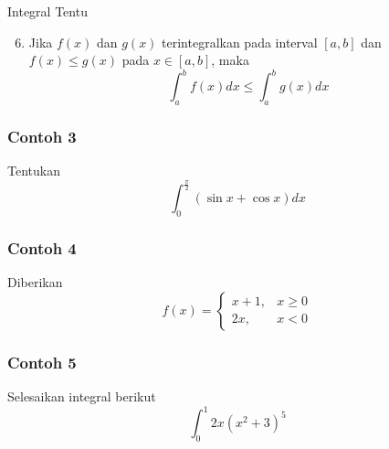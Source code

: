 \documentclass[pdflatex,compress,mathserif]{beamer}
\begin{document}
		\begin{frame}{Integral Tentu}
			\begin{enumerate}\setcounter{enumi}{5}
				\item Jika $ f(x) $ dan $ g(x) $ terintegralkan pada interval $ [a, b] $ dan $ f(x) \leq g(x) $ pada $ x \in [a, b] $,
				maka
				\begin{equation}
					\int_{a}^{b} f(x) dx \leq \int_{a}^{b} g(x) dx
				\end{equation}
			\end{enumerate}
		\end{frame}
		
		\begin{frame}
			\frametitle{Contoh 3}
			Tentukan $$ \int_{0}^{\frac{\pi}{2}} (\sin x + \cos x) dx $$
			\vfill
		\end{frame}
		
		\begin{frame}
			\frametitle{Contoh 4}
			Diberikan $$ f(x) = \begin{cases}
				x + 1, &x \geq 0 \\
				2x, &x < 0
			\end{cases} $$
			\vfill
		\end{frame}
	
		\begin{frame}
			\frametitle{Contoh 5}
			Selesaikan integral berikut $$ \int_{0}^{1} 2x(x^2+3)^5 $$
			\vfill
		\end{frame}
	
\end{document}
